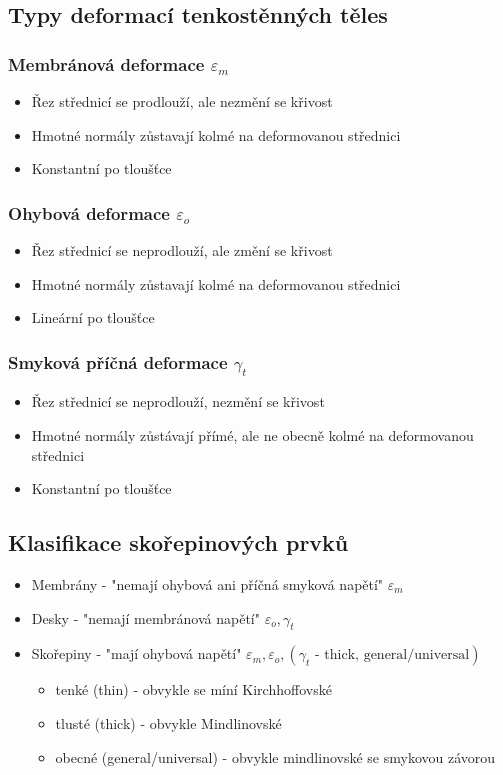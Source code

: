 \documentclass[10pt,oneside]{article}
\begin{document}
\subsection*{Typy deformací tenkostěnných těles}

\subsubsection*{Membránová deformace $\varepsilon_m$}
\begin{itemize}
	\item Řez střednicí se prodlouží, ale nezmění se křivost
	\item Hmotné normály zůstavají kolmé na deformovanou střednici
	\item Konstantní po tloušťce
\end{itemize}

\subsubsection*{Ohybová deformace $\varepsilon_o$}
\begin{itemize}
	\item Řez střednicí se neprodlouží, ale změní se křivost
	\item Hmotné normály zůstavají kolmé na deformovanou střednici
	\item Lineární po tloušťce
\end{itemize}

\subsubsection*{Smyková příčná deformace $\gamma_t$}
\begin{itemize}
	\item Řez střednicí se neprodlouží, nezmění se křivost
	\item Hmotné normály zůstávají přímé, ale ne obecně kolmé na deformovanou střednici
	\item Konstantní po tloušťce
\end{itemize}

\subsection*{Klasifikace skořepinových prvků}
\begin{itemize}
\item Membrány - "nemají ohybová ani příčná smyková napětí" $\varepsilon_m$
\item Desky - "nemají membránová napětí" $\varepsilon_o, \gamma_t$
\item Skořepiny - "mají ohybová napětí" $\varepsilon_m, \varepsilon_o, (\gamma_t \text{ - thick, general/universal})$
	\begin{itemize}
	\item tenké (thin) - obvykle se míní Kirchhoffovské
	\item tlusté (thick) - obvykle Mindlinovské
	\item obecné (general/universal) - obvykle mindlinovské se smykovou závorou
	\end{itemize}
\end{itemize}
\end{document}
